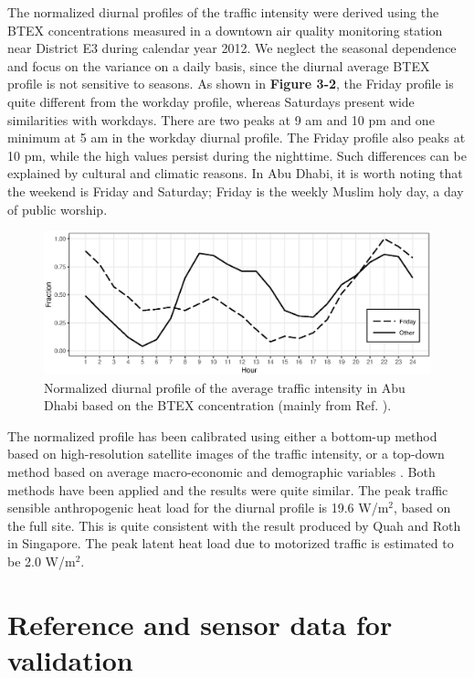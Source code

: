 The normalized diurnal profiles of the traffic intensity were derived using the BTEX concentrations measured in a downtown air quality monitoring station near District E3 during calendar year 2012. We neglect the seasonal dependence and focus on the variance on a daily basis, since the diurnal average BTEX profile is not sensitive to seasons. As shown in \textbf{Figure 3-2}, the Friday profile is quite different from the workday profile, whereas Saturdays present wide similarities with workdays. There are two peaks at 9 am and 10 pm and one minimum at 5 am in the workday diurnal profile. The Friday profile also peaks at 10 pm, while the high values persist during the nighttime. Such differences can be explained by cultural and climatic reasons. In Abu Dhabi, it is worth noting that the weekend is Friday and Saturday; Friday is the weekly Muslim holy day, a day of public worship.

\begin{figure}
\centering
\includegraphics[width=.8\linewidth]{TrafficHeat.eps}
\caption{Normalized diurnal profile of the average traffic intensity in Abu Dhabi based on the BTEX concentration (mainly from Ref. \cite{afshari2017estimation}).}
\end{figure}

The normalized profile has been calibrated using either a bottom-up method based on high-resolution satellite images of the traffic intensity, or a top-down method based on average macro-economic and demographic variables \cite{afshari2017estimation}. Both methods have been applied and the results were quite similar. The peak traffic sensible anthropogenic heat load for the diurnal profile is 19.6 W/m$^2$, based on the full site. This is quite consistent with the result produced by Quah and Roth \cite{quah2012diurnal} in Singapore. The peak latent heat load due to motorized traffic is estimated to be 2.0 W/m$^2$.

\section{Reference and sensor data for validation}


